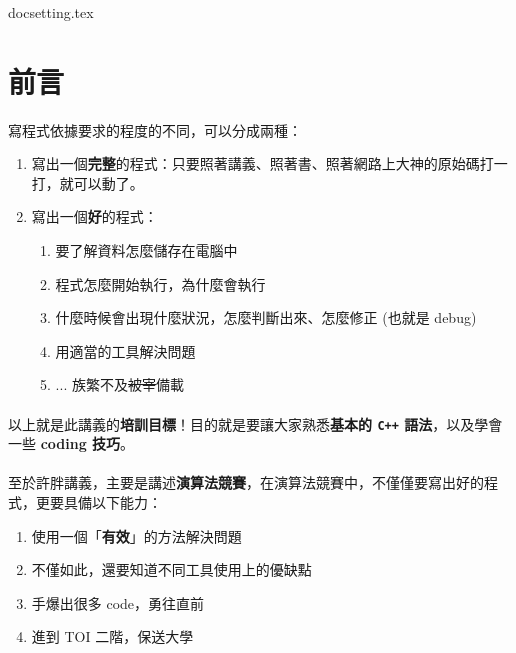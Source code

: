 \documentclass[12pt,a4paper,oneside]{article}
\begin{document}
\begin{CJK}{UTF8}{bkai}

{docsetting.tex}
\setcounter{section}{0}

\fi

\section*{前言}

\paragraph{}寫程式依據要求的程度的不同，可以分成兩種：
\begin{enumerate}
\item 寫出一個\textbf{完整}的程式：只要照著講義、照著書、照著網路上大神的原始碼打一打，就可以動了。
\item 寫出一個\textbf{好}的程式：
  \begin{enumerate}
    \item 要了解資料怎麼儲存在電腦中
    \item 程式怎麼開始執行，為什麼會執行
    \item 什麼時候會出現什麼狀況，怎麼判斷出來、怎麼修正 (也就是 debug)
    \item 用適當的工具解決問題
    \item ... 族繁不及\sout{被宰}備載
  \end{enumerate}
\end{enumerate}

\paragraph{}以上就是此講義的\textbf{培訓目標}！目的就是要讓大家熟悉\textbf{基本的 \texttt{C++} 語法}，以及學會一些 \textbf{coding 技巧}。

\paragraph{}至於許胖講義，主要是講述\textbf{演算法競賽}，在演算法競賽中，不僅僅要寫出好的程式，更要具備以下能力：
\begin{enumerate}
\item 使用一個「\textbf{有效}」的方法解決問題
\item 不僅如此，還要知道不同工具使用上的優缺點
\item 手爆出很多 code，勇往直前
\item 進到 TOI 二階，保送大學
\end{enumerate}


\end{CJK}
\end{document}
